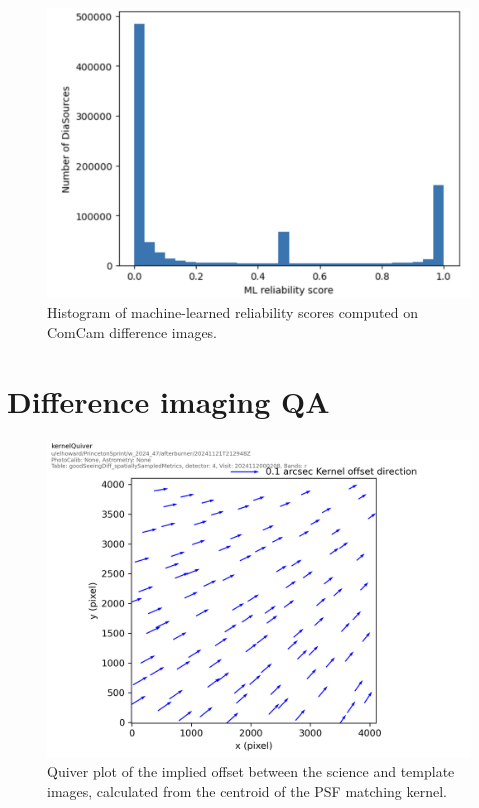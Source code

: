 \begin{figure}
\includegraphics[width=\textwidth]{dia/figures/reliability_histogram.png}
\caption{Histogram of machine-learned reliability scores computed on ComCam difference images. \label{fig:reliability_hist}}
\end{figure}

\section{Difference imaging QA}

\begin{figure}
\includegraphics[width=\textwidth]{dia/figures/Diffim kernel quiver plot.png}
\caption{Quiver plot of the implied offset between the science and template images, calculated from the centroid of the PSF matching kernel. \label{fig:diffim-quiver}}
\end{figure}

